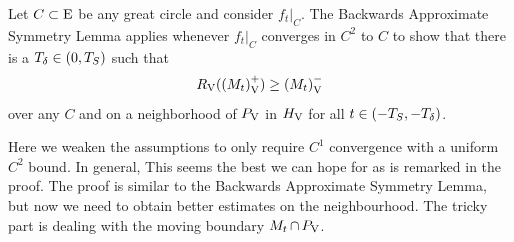 \documentclass{amsart}
\begin{document}
Let \(C\subset \operatorname{E}\) be any great circle and consider \(f_t|_C\). The Backwards Approximate Symmetry Lemma \cite[Lemma 5.1]{bryanlouie} applies whenever \(f_t|_C\) converges in \(C^2\) to \(C\) to show that there is a \(T_{\operatorname{\delta}} \in (0, T_S)\) such that
\[
R_{\operatorname{V}}({(M_t)}_{\operatorname{V}}^+) \geq {(M_t)}_{\operatorname{V}}^-
\]
over any \(C\) and on a neighborhood of \(P_{\operatorname{V}}\) in \({H}_{{\operatorname{V}}}\) for all \(t \in (-T_S, -T_{\operatorname{\delta}})\).

Here we weaken the assumptions to only require \(C^1\) convergence with a uniform \(C^2\) bound. In general, This seems the best we can hope for as is remarked in the proof. The proof is similar to the Backwards Approximate Symmetry Lemma, but now we need to obtain better estimates on the neighbourhood. The tricky part is dealing with the moving boundary \(M_t \operatorname{\cap} P_{\operatorname{V}}\).
\end{document}
